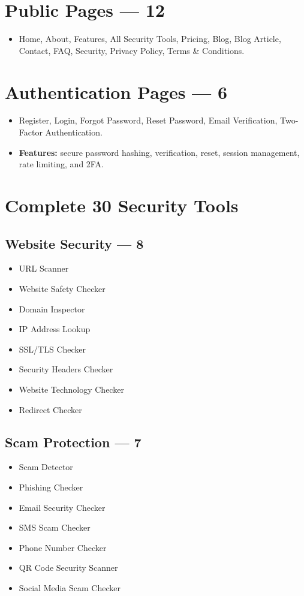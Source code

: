 \documentclass[11pt,a4paper]{article}
\begin{document}
\section{Public Pages — 12}
\begin{itemize}[noitemsep]
    \item Home, About, Features, All Security Tools, Pricing, Blog, Blog Article, Contact, FAQ, Security, Privacy Policy, Terms \& Conditions.
\end{itemize}

\section{Authentication Pages — 6}
\begin{itemize}[noitemsep]
    \item Register, Login, Forgot Password, Reset Password, Email Verification, Two-Factor Authentication.
    \item \textbf{Features:} secure password hashing, verification, reset, session management, rate limiting, and 2FA.
\end{itemize}

\section{Complete 30 Security Tools}

\subsection*{Website Security — 8}
\begin{itemize}[noitemsep]
    \item URL Scanner
    \item Website Safety Checker
    \item Domain Inspector
    \item IP Address Lookup
    \item SSL/TLS Checker
    \item Security Headers Checker
    \item Website Technology Checker
    \item Redirect Checker
\end{itemize}

\subsection*{Scam Protection — 7}
\begin{itemize}[noitemsep]
    \item Scam Detector
    \item Phishing Checker
    \item Email Security Checker
    \item SMS Scam Checker
    \item Phone Number Checker
    \item QR Code Security Scanner
    \item Social Media Scam Checker
\end{itemize}
\end{document}
